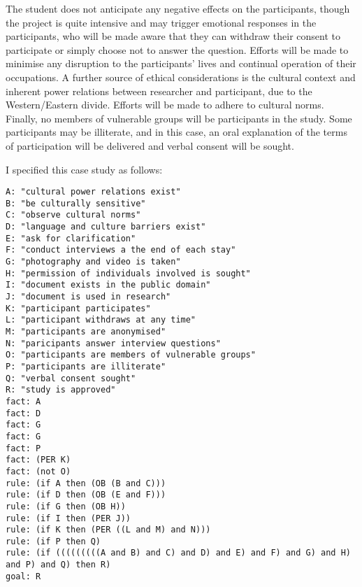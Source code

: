 \documentclass{l4proj}
\begin{document}
The student does not anticipate any negative effects on the participants, though the project is quite intensive and may trigger emotional responses in the participants, who will be made aware that they can withdraw their consent to participate or simply choose not to answer the question. Efforts will be made to minimise any disruption to the participants' lives and continual operation of their occupations. A further source of ethical considerations is the cultural context and inherent power relations between researcher and participant, due to the Western/Eastern divide. Efforts will be made to adhere to cultural norms. Finally, no members of vulnerable groups will be participants in the study. Some participants may be illiterate, and in this case, an oral explanation of the terms of participation will be delivered and verbal consent will be sought. 

I specified this case study as follows: 
\begin{verbatim}
A: "cultural power relations exist"
B: "be culturally sensitive"
C: "observe cultural norms"
D: "language and culture barriers exist"
E: "ask for clarification"
F: "conduct interviews a the end of each stay"
G: "photography and video is taken"
H: "permission of individuals involved is sought"
I: "document exists in the public domain"
J: "document is used in research"
K: "participant participates"
L: "participant withdraws at any time"
M: "participants are anonymised"
N: "paricipants answer interview questions"
O: "participants are members of vulnerable groups"
P: "participants are illiterate"
Q: "verbal consent sought"
R: "study is approved"
fact: A
fact: D
fact: G
fact: G
fact: P
fact: (PER K)
fact: (not O)
rule: (if A then (OB (B and C)))
rule: (if D then (OB (E and F)))
rule: (if G then (OB H))
rule: (if I then (PER J))
rule: (if K then (PER ((L and M) and N)))
rule: (if P then Q)
rule: (if (((((((((A and B) and C) and D) and E) and F) and G) and H) and P) and Q) then R)
goal: R
\end{verbatim}
\end{document}
